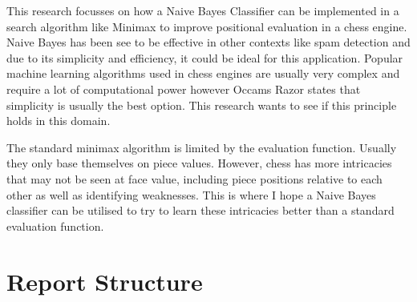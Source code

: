 \documentclass[11pt]{informatics-report}
\begin{document}
This research focusses on how a Naive Bayes Classifier can be implemented in a search algorithm like Minimax to improve positional evaluation in a chess engine. Naive Bayes has been see to be effective in other contexts like spam detection and due to its simplicity and efficiency, it could be ideal for this application. Popular machine learning algorithms used in chess engines are usually very complex and require a lot of computational power however Occams Razor states that simplicity is usually the best option. This research wants to see if this principle holds in this domain. 

The standard minimax algorithm is limited by the evaluation function. Usually they only base themselves on piece values. However, chess has more intricacies that may not be seen at face value, including piece positions relative to each other as well as identifying weaknesses. This is where I hope a Naive Bayes classifier can be utilised to try to learn these intricacies better than a standard evaluation function.




\section{Report Structure}













\appendix



\end{document}
